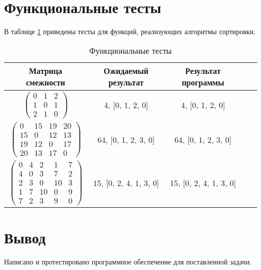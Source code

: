 \FloatBarrier

\section{Функциональные тесты}

В таблице \ref{tbl:functional_test} приведены тесты для функций, реализующих алгоритмы сортировки.

\begin{center}
	\captionsetup{justification=raggedright,singlelinecheck=off}
	\begin{longtable}[c]{|c|c|c|c|c|}
		\caption{Функциональные тесты\label{tbl:functional_test}} \\ \hline
		Матрица смежности & Ожидаемый результат & Результат программы \\
		\hline		
		$ \begin{pmatrix}
			0 & 1 & 2 \\
			1 & 0 & 1 \\
			2 & 1 & 0	
		\end{pmatrix}$ &
		4, [0, 1, 2, 0] &
		4, [0, 1, 2, 0] \\
		
		$ \begin{pmatrix}
			0 & 15 & 19 & 20 \\
			15 &  0 & 12 & 13 \\
			19 & 12 &  0 & 17 \\
			20 & 13 & 17 &  0
		\end{pmatrix}$ &
		64, [0, 1, 2, 3, 0] &
		64, [0, 1, 2, 3, 0] \\
		
		$ \begin{pmatrix}
			0 &  4 &  2 &  1 & 7 \\
			4 &  0 &  3 &  7 & 2 \\
			2 &  3 &  0 & 10 & 3 \\
			1 &  7 & 10 &  0 & 9 \\
			7 &  2 &  3 &  9 & 0
		\end{pmatrix}$ &
		15, [0, 2, 4, 1, 3, 0] &
		15, [0, 2, 4, 1, 3, 0] \\
		\hline
	\end{longtable}
\end{center}

\FloatBarrier


\section*{Вывод}

Написано и протестировано программное обеспечение для поставленной задачи.
